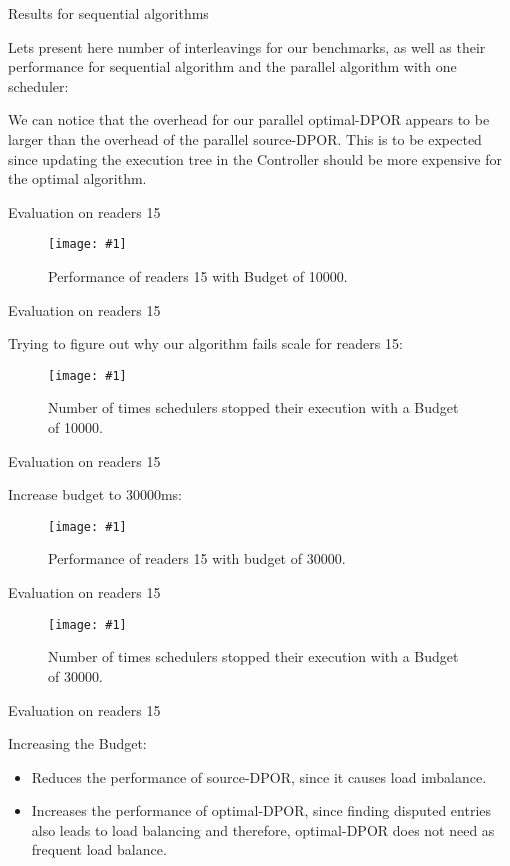 \documentclass[9pt]{beamer}
\newcommand{\customGraph}[2]{
\begin{figure}[H]
\centering
\texttt{[image: \#1]}
\caption{#2}
\label{#2}
\end{figure}
}
\newcommand{\bigtabular}[2]{
 \begin{table} 
   \resizebox{\linewidth}{!}{
      
    }
    \caption{#2}
    \label{#2}
 \end{table}
}
\begin{document}
\begin{frame}{Results for sequential algorithms}

Lets present here number of interleavings for our benchmarks, as well as their performance for sequential algorithm and the parallel algorithm with one scheduler:

\bigtabular{"../tables/synthetic_unbounded.tex"}{Sequential source-DPOR vs optimal-DPOR for our benchmarks.}

We can notice that the overhead for our parallel optimal-DPOR appears to be larger than the overhead of the parallel source-DPOR.
This is to be expected since updating the execution tree in the Controller should be more expensive for the optimal algorithm.


\end{frame}

\begin{frame}{Evaluation on readers 15}

\customGraph{../scripts/readers_15_10000_combo_time.png}{Performance of readers 15 with Budget of 10000.}

\end{frame}


\begin{frame}{Evaluation on readers 15}

Trying to figure out why our algorithm fails scale for readers 15:

\customGraph{../scripts/readers1510000_combined_stack.png}{Number of times schedulers stopped their execution with a Budget of 10000.}

\end{frame}


\begin{frame}{Evaluation on readers 15}

Increase budget to 30000ms:

\customGraph{../scripts/readers_15_30000_combo_time.png}{Performance of readers 15 with budget of 30000.}

\end{frame}

\begin{frame}{Evaluation on readers 15}


\customGraph{../scripts/readers1530000_combined_stack.png}{Number of times schedulers stopped their execution with a Budget of 30000.}

\end{frame}


\begin{frame}{Evaluation on readers 15}

Increasing the Budget:

\begin{itemize}
\item Reduces the performance of source-DPOR, since it causes load imbalance.
\item Increases the performance of optimal-DPOR, since finding disputed entries also leads to load balancing and therefore,
optimal-DPOR does not need as frequent load balance.
\end{itemize}

\end{frame}
\end{document}
